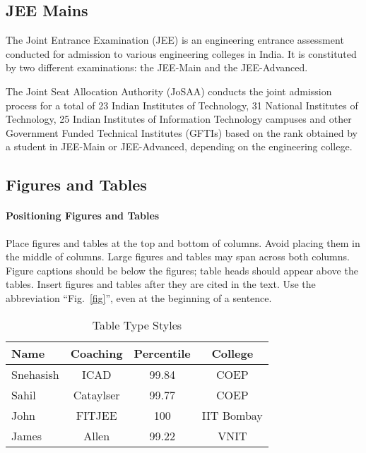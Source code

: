 \documentclass[conference]{IEEEtran}
\begin{document}
\subsection{JEE Mains}
The Joint Entrance Examination (JEE) is an engineering entrance assessment conducted for admission to various engineering colleges in India. It is constituted by two different examinations: the JEE-Main and the JEE-Advanced.

The Joint Seat Allocation Authority (JoSAA) conducts the joint admission process for a total of 23 Indian Institutes of Technology, 31 National Institutes of Technology, 25 Indian Institutes of Information Technology campuses and other Government Funded Technical Institutes (GFTIs) based on the rank obtained by a student in JEE-Main or JEE-Advanced, depending on the engineering college.

\subsection{Figures and Tables}
\paragraph{Positioning Figures and Tables} Place figures and tables at the top and 
bottom of columns. Avoid placing them in the middle of columns. Large 
figures and tables may span across both columns. Figure captions should be 
below the figures; table heads should appear above the tables. Insert 
figures and tables after they are cited in the text. Use the abbreviation 
``Fig.~\ref{fig}'', even at the beginning of a sentence.

\begin{table}[h!]
\caption{Table Type Styles}
\begin{center}
\begin{tabular}{|l|c|c|c|}
\hline
\textbf{Name} & \textbf{Coaching} & \textbf{Percentile} & \textbf{College}\\
\hline
Snehasish & ICAD & 99.84 & COEP\\
\hline
Sahil & Cataylser & 99.77 & COEP\\
\hline
John & FITJEE & 100 & IIT Bombay\\
\hline
James & Allen & 99.22 & VNIT\\
\hline




\end{tabular}
\end{center}
\end{table}
\end{document}
